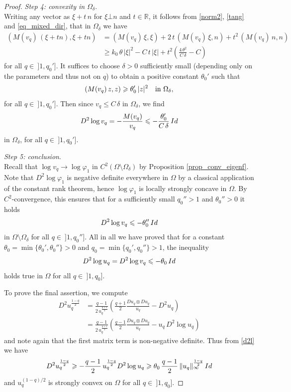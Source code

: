 \documentclass[10pt,a4paper]{amsart}
\newcommand{\R}{{\mathbb R}}
\newcommand{\beq}{\begin{equation}}
\newcommand{\eeq}{\end{equation}}
\renewcommand{\ge}{\geqslant}
\renewcommand{\le}{\leqslant}
\begin{document}
\begin{proof}
 \smallskip
 {\em Step 4: convexity in $\Omega_{\delta}$}.\ \\
Writing any vector as $\xi+t\, n$ for $\xi\bot n$ and $t\in \R$, it follows from \eqref{norm2}, \eqref{tang} and \eqref{eq_mixed_dir}, that in $\Omega_\delta$ we have
 \[
 \begin{split}
 \left(M(v_q) \, (\xi+tn), \xi+tn\right)&=(M(v_q)\, \xi, \xi) +2\, t\, (M(v_q)\, \xi, n)+t^2\, (M(v_q) \, n, n)\\
 &\ge 
 k_0\, \theta\, |\xi|^2-C\, t\, |\xi| +t^2\left(\frac{4\, \theta^2}{C\, \delta}- C\right)
 \end{split}
 \]
 for all $q\in \ ]1, q_0']$. It suffices to choose $\delta>0$ sufficiently small (depending only on the parameters and thus not on $q$) to obtain a positive constant $\theta_0'$ such that
 \[
\left( M(v_q)\, z, z\right)\ge \theta_0'\, |z|^2 \quad \hbox{in $\Omega_{\delta}$},
\]
for all $q\in \ ]1, q_0']$. Then since $v_q\le C\, \delta $ in $\Omega_\delta$, we find
 \[
 D^2\log v_q=-\frac{M(v_q)}{v_q}\le -\frac{\theta_0'}{C\, \delta}\, {\rm Id} 
 \]
in $\Omega_\delta$, for all $q\in \ ]1, q_0']$. 
 
 \smallskip
 {\em Step 5: conclusion}.\ \\
Recall that $\log v_q\to \log \varphi_1$ in $C^2(\Omega\setminus\Omega_\delta)$ by Proposition \ref{prop_conv_eigenf}. Note that $D^2\log\varphi_1$ is negative definite everywhere in $\Omega$ by a classical application of the constant rank theorem, hence $\log\varphi_1$ is locally strongly concave in $\Omega$. 
By $C^2$-convergence, this ensures that for a sufficiently small $q_0''>1$ and $\theta_0''>0$ it holds
 \[
 D^2\log v_q\le -\theta_0''\, {\rm Id}
 \]
 in $\Omega\setminus \Omega_\delta$ for all $q\in \ ]1, q_0'']$. 
All in all we have proved that for a constant $\theta_0=\min\{\theta_0', \theta_0''\}>0$ and $q_0=\min\{q_0', q_0''\}>1$, the inequality
 \beq
 \label{d2l}
 D^2\log u_q=D^2\log v_q\le -\theta_0\, {\rm Id}
 \eeq
 holds true in $\Omega$ for all $q\in \ ]1, q_0]$.

 To prove the final assertion, we compute 
 \[
 \begin{split}
 D^2 u_q^{\frac{1-q}{2}}&=\frac{q-1}{2\, u_q^{\frac{q+1}{2}}}\left(\frac{q+1}{2}\frac{D u_q\otimes D u_q}{u_q}- D^2u_q\right)\\
 &=\frac{q-1}{2\, u_q^{\frac{q+1}{2}}}\left(\frac{q-1}{2}\frac{D u_q\otimes D u_q}{u_q}-u_q\, D^2\log u_q\right)
 \end{split}
 \]
 and note again that the first matrix term is non-negative definite. 
Thus from \eqref{d2l} we have
 \[
 D^2 u_q^{\frac{1-q}{2}}\ge -\frac{q-1}{2}\, u_q^{\frac{1-q}{2}} D^2\log u_q\ge \theta_0\, \frac{q-1}{2}\, \|u_q\|_\infty^{\frac{1-q}{2}}\, {\rm Id}
 \]
and $u_q^{(1-q)/2}$ is strongly convex on $\Omega$ for all $q\in \ ]1, q_0]$. 
\end{proof}
\end{document}
